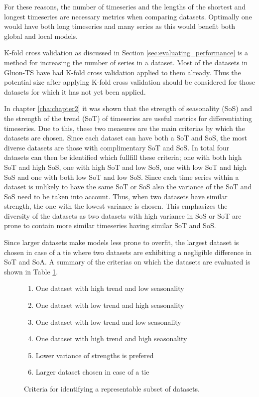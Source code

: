 For these reasons, the number of timeseries and the lengths of the shortest and longest timeseries are necessary metrics when comparing datasets. Optimally one would have both long timeseries and many series as this would benefit both global and local models.

K-fold cross validation as discussed in Section \ref{sec:evaluating_performance} is a method for increasing the number of series in a dataset. Most of the datasets in Gluon-TS have had K-fold cross validation applied to them already. Thus the potential size after applying K-fold cross validation should be considered for those datasets for which it has not yet been applied.

In chapter \ref{cha:chapter2} it was shown that the strength of seasonality (SoS) and the strength of the trend (SoT) of timeseries are useful metrics for differentiating timeseries. Due to this, these two measures are the main criterias by which the datasets are chosen. Since each dataset can have both a SoT and SoS, the most diverse datasets are those with complimentary SoT and SoS. In total four datasets can then be identified which fullfill these criteria; one with both high SoT and high SoS, one with high SoT and low SoS, one with low SoT and high SoS and one with both low SoT and low SoS. Since each time series within a dataset is unlikely to have the same SoT or SoS also the variance of the SoT and SoS need to be taken into account. Thus, when two datasets have similar strength, the one with the lowest variance is chosen. This emphasizes the diversity of the datasets as two datasets with high variance in SoS or SoT are prone to contain more similar timeseries having similar SoT and SoS.

Since larger datasets make models less prone to overfit, the largest dataset is chosen in case of a tie where two datasets are exhibiting a negligible difference in SoT and SoA. A summary of the criterias on which the datasets are evaluated is shown in Table \ref{dataset_criteria}.

\begin{figure}[h]
  \begin{enumerate}
    \item One dataset with high trend and low seasonality
    \item One dataset with low trend and high seasonality
    \item One dataset with low trend and low seasonality
    \item One dataset with high trend and high seasonality
    \item Lower variance of strengths is prefered
    \item Larger dataset chosen in case of a tie
  \end{enumerate}
  \caption{Criteria for identifying a representable subset of datasets.}
  \label{dataset_criteria}
\end{figure}


